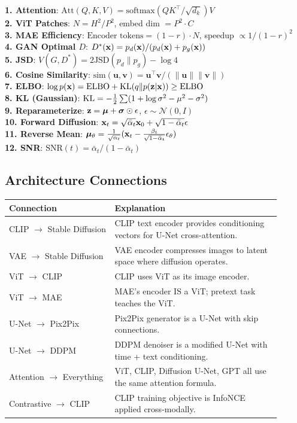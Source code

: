\textbf{1. Attention}: $\text{Att}(Q,K,V) = \text{softmax}(QK^\top/\sqrt{d_k})V$ \\[2pt]
\textbf{2. ViT Patches}: $N = H^2/P^2$, embed dim $= P^2 \cdot C$ \\[2pt]
\textbf{3. MAE Efficiency}: $\text{Encoder tokens} = (1-r) \cdot N$, speedup $\propto 1/(1-r)^2$ \\[2pt]
\textbf{4. GAN Optimal $D$}: $D^*(\mathbf{x}) = p_d(\mathbf{x})/(p_d(\mathbf{x})+p_g(\mathbf{x}))$ \\[2pt]
\textbf{5. JSD}: $V(G,D^*) = 2\text{JSD}(p_d\|p_g) - \log 4$ \\[2pt]
\textbf{6. Cosine Similarity}: $\text{sim}(\mathbf{u},\mathbf{v}) = \mathbf{u}^\top\mathbf{v}/(\|\mathbf{u}\|\|\mathbf{v}\|)$ \\[2pt]
\textbf{7. ELBO}: $\log p(\mathbf{x}) = \text{ELBO} + \text{KL}(q\|p(\mathbf{z}|\mathbf{x})) \geq \text{ELBO}$ \\[2pt]
\textbf{8. KL (Gaussian)}: $\text{KL} = -\frac{1}{2}\sum(1+\log\sigma^2-\mu^2-\sigma^2)$ \\[2pt]
\textbf{9. Reparameterize}: $\mathbf{z} = \boldsymbol{\mu} + \boldsymbol{\sigma} \odot \epsilon$, \quad $\epsilon \sim \mathcal{N}(0,I)$ \\[2pt]
\textbf{10. Forward Diffusion}: $\mathbf{x}_t = \sqrt{\bar\alpha_t}\mathbf{x}_0 + \sqrt{1-\bar\alpha_t}\epsilon$ \\[2pt]
\textbf{11. Reverse Mean}: $\boldsymbol{\mu}_\theta = \frac{1}{\sqrt{\alpha_t}}(\mathbf{x}_t - \frac{\beta_t}{\sqrt{1-\bar\alpha_t}}\epsilon_\theta)$ \\[2pt]
\textbf{12. SNR}: $\text{SNR}(t) = \bar\alpha_t/(1-\bar\alpha_t)$

\subsection{Architecture Connections}
\begin{center}\small
\begin{tabular}{p{0.35\linewidth}p{0.55\linewidth}}\toprule
\textbf{Connection} & \textbf{Explanation} \\\midrule
CLIP $\to$ Stable Diffusion & CLIP text encoder provides conditioning vectors for U-Net cross-attention. \\
VAE $\to$ Stable Diffusion & VAE encoder compresses images to latent space where diffusion operates. \\
ViT $\to$ CLIP & CLIP uses ViT as its image encoder. \\
ViT $\to$ MAE & MAE's encoder IS a ViT; pretext task teaches the ViT. \\
U-Net $\to$ Pix2Pix & Pix2Pix generator is a U-Net with skip connections. \\
U-Net $\to$ DDPM & DDPM denoiser is a modified U-Net with time + text conditioning. \\
Attention $\to$ Everything & ViT, CLIP, Diffusion U-Net, GPT all use the same attention formula. \\
Contrastive $\to$ CLIP & CLIP training objective is InfoNCE applied cross-modally. \\
\bottomrule
\end{tabular}
\end{center}

